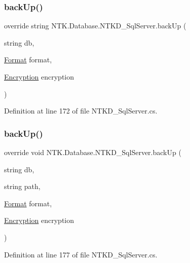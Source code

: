 \subsubsection{\texorpdfstring{backUp()}{backUp()}\hspace{0.1cm}{\footnotesize\ttfamily [1/2]}}
{\footnotesize\ttfamily override string N\+T\+K.\+Database.\+N\+T\+K\+D\+\_\+\+Sql\+Server.\+back\+Up (\begin{DoxyParamCaption}\item[{string}]{db,  }\item[{\mbox{\hyperlink{namespace_n_t_k_1_1_database_a9bed700210ca4ed5854002637b664789}{Format}}}]{format,  }\item[{\mbox{\hyperlink{namespace_n_t_k_1_1_database_aa21afe93187a6c77c4ccdc988b3c4ac2}{Encryption}}}]{encryption }\end{DoxyParamCaption})}



Definition at line 172 of file N\+T\+K\+D\+\_\+\+Sql\+Server.\+cs.

\mbox{\label{class_n_t_k_1_1_database_1_1_n_t_k_d___sql_server_a65f31788ddd6e53215d0977e4ff5ce64}} 
\subsubsection{\texorpdfstring{backUp()}{backUp()}\hspace{0.1cm}{\footnotesize\ttfamily [2/2]}}
{\footnotesize\ttfamily override void N\+T\+K.\+Database.\+N\+T\+K\+D\+\_\+\+Sql\+Server.\+back\+Up (\begin{DoxyParamCaption}\item[{string}]{db,  }\item[{string}]{path,  }\item[{\mbox{\hyperlink{namespace_n_t_k_1_1_database_a9bed700210ca4ed5854002637b664789}{Format}}}]{format,  }\item[{\mbox{\hyperlink{namespace_n_t_k_1_1_database_aa21afe93187a6c77c4ccdc988b3c4ac2}{Encryption}}}]{encryption }\end{DoxyParamCaption})}



Definition at line 177 of file N\+T\+K\+D\+\_\+\+Sql\+Server.\+cs.

\mbox{\label{class_n_t_k_1_1_database_1_1_n_t_k_d___sql_server_aa1965f88c6f8e9cd2082acd89e1580b9}} 
